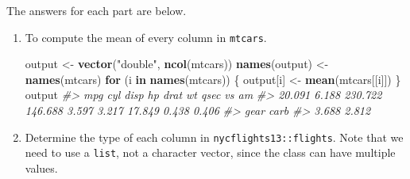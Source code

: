 \documentclass[]{book}
\newenvironment{Shaded}{\begin{snugshade}}{\end{snugshade}}
\newcommand{\CommentTok}[1]{\textcolor[rgb]{0.56,0.35,0.01}{\textit{#1}}}
\newcommand{\ControlFlowTok}[1]{\textcolor[rgb]{0.13,0.29,0.53}{\textbf{#1}}}
\newcommand{\KeywordTok}[1]{\textcolor[rgb]{0.13,0.29,0.53}{\textbf{#1}}}
\newcommand{\NormalTok}[1]{#1}
\newcommand{\StringTok}[1]{\textcolor[rgb]{0.31,0.60,0.02}{#1}}
\theoremstyle{plain}
\theoremstyle{remark}
\theoremstyle{definition}
\theoremstyle{definition}
\theoremstyle{definition}
\theoremstyle{remark}
\begin{document}
The answers for each part are below.

\begin{enumerate}
\def\labelenumi{\arabic{enumi}.}
\item
  To compute the mean of every column in \texttt{mtcars}.

\begin{Shaded}
\begin{Highlighting}[]
\NormalTok{output <-}\StringTok{ }\KeywordTok{vector}\NormalTok{(}\StringTok{"double"}\NormalTok{, }\KeywordTok{ncol}\NormalTok{(mtcars))}
\KeywordTok{names}\NormalTok{(output) <-}\StringTok{ }\KeywordTok{names}\NormalTok{(mtcars)}
\ControlFlowTok{for}\NormalTok{ (i }\ControlFlowTok{in} \KeywordTok{names}\NormalTok{(mtcars)) \{}
\NormalTok{  output[i] <-}\StringTok{ }\KeywordTok{mean}\NormalTok{(mtcars[[i]])}
\NormalTok{\}}
\NormalTok{output}
\CommentTok{#>     mpg     cyl    disp      hp    drat      wt    qsec      vs      am }
\CommentTok{#>  20.091   6.188 230.722 146.688   3.597   3.217  17.849   0.438   0.406 }
\CommentTok{#>    gear    carb }
\CommentTok{#>   3.688   2.812}
\end{Highlighting}
\end{Shaded}
\item
  Determine the type of each column in \texttt{nycflights13::flights}.
  Note that we need to use a \texttt{list}, not a character vector,
  since the class can have multiple values.


\end{enumerate}
\end{document}
